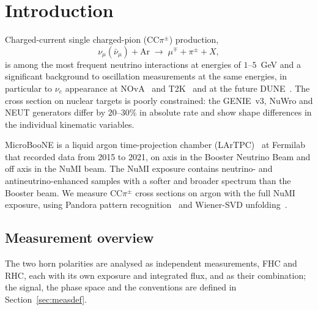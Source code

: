 \documentclass[11pt,a4paper]{article}
\newcommand{\uboone}{MicroBooNE}
\begin{document}
\begin{titlepage}
\begin{abstract}
    The extraction passes closure, ensembles of pseudo-experiments (pull widths $0.95$--$1.07$) and
    pseudo-data from reweighted interaction models (largest bias $1.1\sigma$, in one $\cos\theta_\mu$ bin); no
    closure test with an independent generator has been made.
  \end{abstract}
  \vfill
  \tableofcontents
\end{titlepage}


\section{Introduction}
\label{sec:intro}

Charged-current single charged-pion (CC$\pi^{\pm}$) production,
\begin{equation}
  \nu_\mu(\bar{\nu}_\mu) + \mathrm{Ar} \;\longrightarrow\;
  \mu^{\mp} + \pi^{\pm} + X,
\end{equation}
is among the most frequent neutrino interactions at energies of $1$--$5$~GeV and a significant
background to oscillation measurements at the same energies, in particular to $\nu_e$ appearance
at NOvA~\cite{nova} and T2K~\cite{t2k} and at the future DUNE~\cite{dune}. The cross section on
nuclear targets is poorly constrained: the GENIE~v3, NuWro and NEUT generators differ by
$20$--$30\%$ in absolute rate and show shape differences in the individual kinematic variables.

\uboone{} is a liquid argon time-projection chamber (LArTPC)~\cite{uboone_nim} at Fermilab that
recorded data from 2015 to 2021, on axis in the Booster Neutrino Beam and off axis in the NuMI
beam. The NuMI exposure contains neutrino- and antineutrino-enhanced samples with a softer and
broader spectrum than the Booster beam. We measure CC$\pi^{\pm}$ cross sections on argon with the
full NuMI exposure, using Pandora pattern recognition~\cite{pandora,uboone_pandora} and Wiener-SVD
unfolding~\cite{wienervsd}.

\subsection{Measurement overview}
\label{sec:status}

The two horn polarities are analysed as independent measurements, FHC and RHC, each with its own
exposure and integrated flux, and as their combination; the signal, the phase space and the conventions
are defined in Section~\ref{sec:measdef}.
\end{document}
